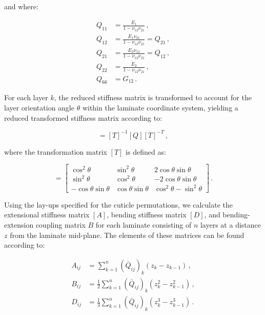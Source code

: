 \documentclass[twocolumn, linenumbers, superscriptaddress]{revtex4-1}
\begin{document}
				and where:
				
				\begin{equation}
				\begin{aligned}
					Q_{11} & = \frac{E_{1}}{1 - \nu_{12}\nu_{21}}\,, \\
					Q_{12} & = \frac{E_{1}\nu_{21}}{1 - \nu_{12}\nu_{21}} = Q_{21}\,, \\
					Q_{21} & = \frac{E_{2}\nu_{12}}{1 - \nu_{12}\nu_{21}} = Q_{12}\,, \\
					Q_{22} & = \frac{E_{2}}{1 - \nu_{12}\nu_{21}}\,, \\
					Q_{66} & = G_{12}\,.
				\end{aligned}
				\end{equation}
				
				For each layer $k$, the reduced stiffness matrix is transformed to account for the layer orientation angle $\theta$ within the laminate coordinate system, yielding a reduced transformed stiffness matrix according to:
				
				\begin{equation}
					[\bar{Q}] = [T]^{-1}[Q][T]^{-T}\,,
				\end{equation}
				
				where the transformation matrix $[T]$ is defined as:
				
				\begin{equation}
				[T] =
				 \begin{bmatrix}
					 \cos^2\theta & \sin^2\theta & 2\cos\theta\sin\theta \\
					 \sin^2\theta & \cos^2\theta & -2\cos\theta\sin\theta \\
					 -\cos\theta\sin\theta & \cos\theta\sin\theta & \cos^2\theta - \sin^2\theta
				 \end{bmatrix}\,.
				\end{equation}
				
				Using the lay-ups specified for the cuticle permutations, we calculate the extensional stiffness matrix $[A]$, bending stiffness matrix $[D]$, and bending-extension coupling matrix $B$ for each laminate consisting of $n$ layers at a distance $z$ from the laminate mid-plane.
				The elements of these matrices can be found according to:
				
				\begin{equation}
					\begin{aligned}
						A_{ij} & = \sum_{k = 1}^{n}(\bar{Q}_{ij})_k(z_{k} - z_{k-1})\,, \\
						B_{ij} & = \frac{1}{2}\sum_{k = 1}^{n}(\bar{Q}_{ij})_k(z^2_{k} - z^2_{k-1})\,, \\
						D_{ij} & = \frac{1}{3}\sum_{k = 1}^{n}(\bar{Q}_{ij})_k(z^3_{k} - z^3_{k-1})\,.
					\end{aligned}
				\end{equation}
				
\end{document}
